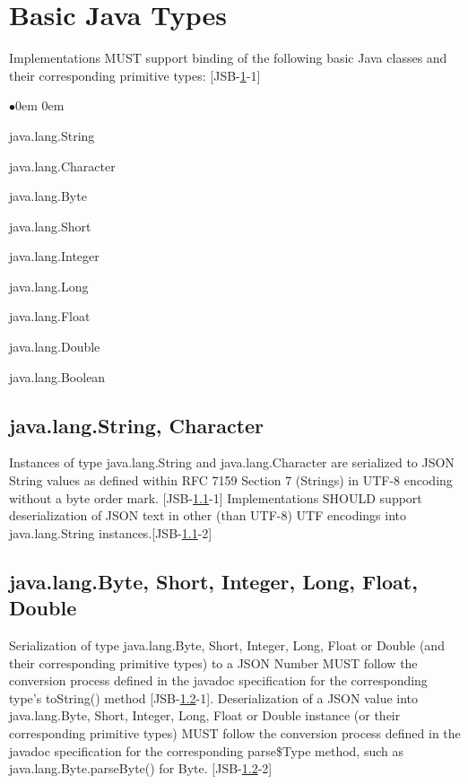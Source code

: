 \section{Basic Java Types}
\label{sec:basic}
Implementations MUST support binding of the following basic Java classes and their corresponding primitive types: [JSB-\ref{sec:basic}-1]
\begin{list}{$\bullet$}{\parsep 0em  0em}
\item java.lang.String
\item java.lang.Character
\item java.lang.Byte
\item java.lang.Short
\item java.lang.Integer
\item java.lang.Long
\item java.lang.Float
\item java.lang.Double
\item java.lang.Boolean
\end{list}

\subsection{java.lang.String, Character}
\label{subsec:string}
Instances of type java.lang.String and java.lang.Character are serialized to JSON String values as defined within RFC 7159 Section 7 (Strings) \cite{rfc7159} in UTF-8 encoding without a byte order mark. [JSB-\ref{subsec:string}-1] 
Implementations SHOULD support deserialization of JSON text in other (than UTF-8) UTF encodings into java.lang.String instances.[JSB-\ref{subsec:string}-2]

\subsection{java.lang.Byte, Short, Integer, Long, Float, Double}
\label{subsec:number}
Serialization of type java.lang.Byte, Short, Integer, Long, Float or Double (and their corresponding primitive types) to a JSON Number
MUST follow the conversion process defined in the javadoc specification for the corresponding type's toString() method [JSB-\ref{subsec:number}-1]. 
Deserialization of a JSON value into java.lang.Byte, Short, Integer, Long, Float or Double instance (or their corresponding primitive types) 
MUST follow the conversion process defined in the javadoc specification for the corresponding
parse\${Type} method, such as java.lang.Byte.parseByte() for Byte. [JSB-\ref{subsec:number}-2]

